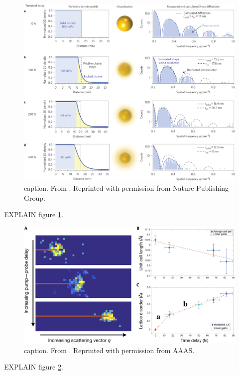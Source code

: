 \begin{figure}
	\centering
		\includegraphics[width=1.00\textwidth]{images/tais-nat-photonics.jpg}
	\caption{caption. From \citep{Gorkhover-2016-NatPho}. Reprinted with permission from Nature Publishing Group.}
	\label{fig:tais-nat-photonics}
\end{figure}
EXPLAIN figure \ref{fig:tais-nat-photonics}.
\begin{figure}
	\centering
		\includegraphics[width=1.00\textwidth]{images/ken-science.jpg}
	\caption{caption. From \citep{Ferguson-2016-SciAdv}. Reprinted with permission from AAAS.}
	\label{fig:ken-science}
\end{figure}
EXPLAIN figure \ref{fig:ken-science}.
%
%
%
%
